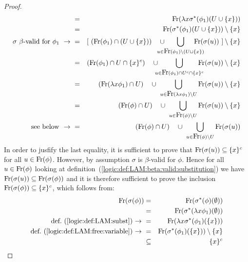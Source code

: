 \begin{proof}
\begin{eqnarray*}
        &=&\free(\lambda x\sigma^{*}(\phi_{1})(U\cup\{x\}))\\
        &=&\free(\sigma^{*}(\phi_{1})(U\cup\{x\}))\setminus\{x\}\\
        \mbox{$\sigma$ $\beta$-valid for $\phi_{1}\ \rightarrow\ $}
        &=& [\ (\free(\phi_{1})\cap(U\cup\{x\}))\ \ \ \cup\ 
            \!\!\!\!\!\!\!\!\!\!
            \bigcup_{u\in\free(\phi_{1})\setminus(U\cup\{x\})}
            \!\!\!\!\!\!\!\!\!\!
            \free(\sigma(u))
             \ ]\setminus\{x\}\\
        &=&(\free(\phi_{1})\cap U\cap \{x\}^{c})\ \ \ \cup\ 
            \!\!\!\!\!\!
            \bigcup_{u\in\free(\phi_{1})\cap U^{c}\cap\{x\}^{c}}
            \!\!\!\!\!\!
            \free(\sigma(u))\setminus\{x\}\\
        &=&(\free(\lambda x\phi_{1})\cap U)\ \ \ \cup\ 
            \bigcup_{u\in\free(\lambda x\phi_{1})\setminus U}
            \free(\sigma(u))\setminus\{x\}\\
        &=&(\free(\phi)\cap U)\ \ \ \cup\ \bigcup_{u\in\free(\phi)\setminus U} 
            \free(\sigma(u))\setminus\{x\}\\
        \mbox{see below $\ \rightarrow\ $}
        &=&(\free(\phi)\cap U)\ \ \ 
            \cup\ 
            \bigcup_{u\in\free(\phi)\setminus U}\free(\sigma(u))
    \end{eqnarray*}
In order to jusfify the last equality, it is sufficient to prove
that $\mbox{\rm Fr}(\sigma(u))\subseteq\{x\}^{c}$ for all $u\in\mbox{\rm Fr}(\phi)$.
However, by assumption $\sigma$ is $\beta$-valid for $\phi$. Hence
for all $u\in\mbox{\rm Fr}(\phi)$ looking at 
definition~(\ref{logic:def:LAM:beta:valid:substitution}) we have 
$\mbox{\rm Fr}(\sigma(u))\subseteq\mbox{\rm Fr}(\sigma(\phi))$ and it is therefore 
sufficient to prove the inclusion $\mbox{\rm Fr}(\sigma(\phi))\subseteq\{x\}^{c}$,
which follows from:
    \begin{eqnarray*}
        \mbox{\rm Fr}(\sigma(\phi))
        &=&\mbox{\rm Fr}(\sigma^{*}(\phi)(\emptyset))\\
        &=&\mbox{\rm Fr}(\sigma^{*}(\lambda x\phi_{1})(\emptyset))\\
        \mbox{def.~(\ref{logic:def:LAM:subst})$\ \rightarrow\ $}
        &=&\mbox{\rm Fr}(\lambda x \sigma^{*}(\phi_{1})(\{x\}))\\
        \mbox{def.~(\ref{logic:def:LAM:free:variable})$\ \rightarrow\ $}
        &=&\mbox{\rm Fr}(\sigma^{*}(\phi_{1})(\{x\}))\setminus\{x\}\\
        &\subseteq&\{x\}^{c}
    \end{eqnarray*}
\end{proof}


